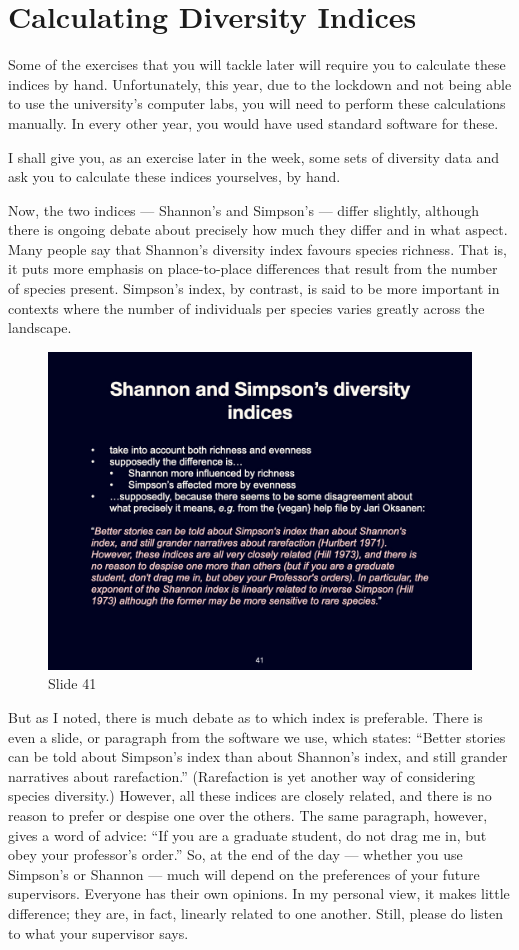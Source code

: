 \documentclass[
  10pt,
]{book}
\begin{document}
\section{Calculating Diversity
Indices}\label{calculating-diversity-indices}

Some of the exercises that you will tackle later will require you to
calculate these indices by hand. Unfortunately, this year, due to the
lockdown and not being able to use the university's computer labs, you
will need to perform these calculations manually. In every other year,
you would have used standard software for these.

I shall give you, as an exercise later in the week, some sets of
diversity data and ask you to calculate these indices yourselves, by
hand.

Now, the two indices --- Shannon's and Simpson's --- differ slightly,
although there is ongoing debate about precisely how much they differ
and in what aspect. Many people say that Shannon's diversity index
favours species richness. That is, it puts more emphasis on
place-to-place differences that result from the number of species
present. Simpson's index, by contrast, is said to be more important in
contexts where the number of individuals per species varies greatly
across the landscape.

\begin{figure}[ht]
\centering
\includegraphics[width=0.8\linewidth]{../images/BDC334/BDC334-041.jpeg}
\caption*{Slide 41}
\end{figure}

But as I noted, there is much debate as to which index is preferable.
There is even a slide, or paragraph from the software we use, which
states: ``Better stories can be told about Simpson's index than about
Shannon's index, and still grander narratives about rarefaction.''
(Rarefaction is yet another way of considering species diversity.)
However, all these indices are closely related, and there is no reason
to prefer or despise one over the others. The same paragraph, however,
gives a word of advice: ``If you are a graduate student, do not drag me
in, but obey your professor's order.'' So, at the end of the day ---
whether you use Simpson's or Shannon --- much will depend on the
preferences of your future supervisors. Everyone has their own opinions.
In my personal view, it makes little difference; they are, in fact,
linearly related to one another. Still, please do listen to what your
supervisor says.
\end{document}
